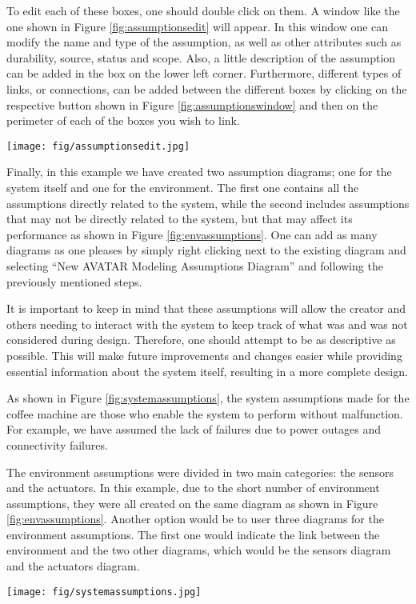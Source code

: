 \documentclass[12pt]{article}
\begin{document}
To edit each of these boxes, one should double click on them. A window like the one shown in Figure \ref{fig:assumptionsedit} will appear. In this window one can modify the name and type of the assumption, as well as other attributes such as durability, source, status and scope. Also, a little description of the assumption can be added in the box on the lower left corner. Furthermore, different types of links, or connections, can be added between the different boxes by clicking on the respective button shown in Figure \ref{fig:assumptionswindow} and then on the perimeter of each of the boxes you wish to link. 

\begin{figure*}[htbp]
\centering
\texttt{[image: fig/assumptionsedit.jpg]}
\caption{Assumptions Editing} \label{fig:assumptionsedit}
\end{figure*}

Finally, in this example we have created two assumption diagrams; one for the system itself and one for the environment. The first one contains all the assumptions directly related to the system, while the second includes assumptions that may not be directly related to the system, but that may affect its performance as shown in Figure \ref{fig:envassumptions}. One can add as many diagrams as one pleases by simply right clicking next to the existing diagram and selecting ``New AVATAR Modeling Assumptions Diagram'' and following the previously mentioned steps.

It is important to keep in mind that these assumptions will allow the creator and others needing to interact with the system to keep track of what was and was not considered during design. Therefore, one should attempt to be as descriptive as possible. This will make future improvements and changes easier while providing essential information about the system itself, resulting in a more complete design. 

As shown in Figure \ref{fig:systemassumptions}, the system assumptions made for the coffee machine are those who enable the system to perform without malfunction. For example, we have assumed the lack of failures due to power outages and connectivity failures. 

The environment assumptions were divided in two main categories: the sensors and the actuators. In this example, due to the short number of environment assumptions, they were all created on the same diagram as shown in Figure \ref{fig:envassumptions}. Another option would be to user three diagrams for the environment assumptions. The first one would indicate the link between the environment and the two other diagrams, which would be the sensors diagram and the actuators diagram.
\begin{figure*}[htbp]
\centering
\texttt{[image: fig/systemassumptions.jpg]}
\caption{System Assumptions} \label{fig:systemassumptions}
\end{figure*}
\end{document}
